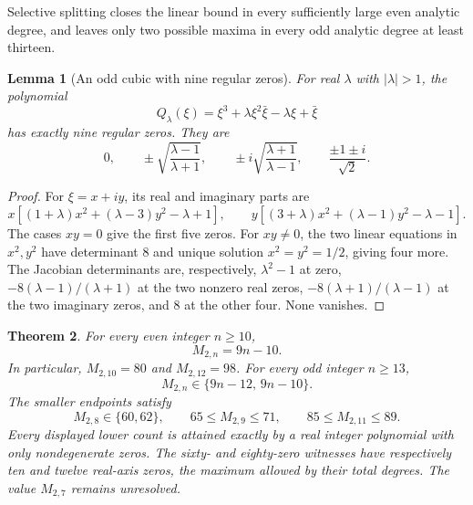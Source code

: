 \documentclass[UTF8,11pt]{ctexart}
\newtheorem{thm}{Theorem}[section]
\newtheorem{lem}[thm]{Lemma}
\theoremstyle{definition}
\numberwithin{equation}{section}
\begin{document}
Selective splitting closes the linear bound in every sufficiently
large even analytic degree, and leaves only two possible
maxima in every odd analytic degree at least thirteen.

\begin{lem}[An odd cubic with nine regular zeros]
\label{v41:lem:oddnine}
For real $\lambda$ with $|\lambda|>1$, the polynomial
\[
                       Q_\lambda(\xi)=\xi^3+
                    \lambda\xi^2\bar\xi-\lambda\xi+\bar\xi
\]
has exactly nine regular zeros. They are
\[
 0,\qquad\pm\sqrt{\frac{\lambda-1}{\lambda+1}},\qquad
 \pm i\sqrt{\frac{\lambda+1}{\lambda-1}},\qquad
 \frac{\pm1\pm i}{\sqrt2}.
\]
\end{lem}
\begin{proof}
For $\xi=x+iy$, its real and imaginary parts are
\[
 x[(1+\lambda)x^2+(\lambda-3)y^2-\lambda+1],\qquad
 y[(3+\lambda)x^2+(\lambda-1)y^2-\lambda-1].
\]
The cases $xy=0$ give the first five zeros. For $xy\ne0$,
the two linear equations in $x^2,y^2$ have determinant
$8$ and unique solution $x^2=y^2=1/2$, giving four more.
The Jacobian determinants are, respectively,
$\lambda^2-1$ at zero,
$-8(\lambda-1)/(\lambda+1)$ at the two nonzero real zeros,
$-8(\lambda+1)/(\lambda-1)$ at the two imaginary zeros,
and $8$ at the other four. None vanishes.
\end{proof}

\begin{thm}\label{v40:thm:rectangle}
For every even integer $n\ge10$,
\begin{equation}\label{v40:eq:rectangle}
                              M_{2,n}=9n-10.
\end{equation}
In particular, $M_{2,10}=80$ and $M_{2,12}=98$.
For every odd integer $n\ge13$,
\begin{equation}\label{v40:eq:oddrectangle}
                         M_{2,n}\in\{9n-12,\,9n-10\}.
\end{equation}
The smaller endpoints satisfy
\begin{equation}\label{v40:eq:rectangle8}
             M_{2,8}\in\{60,62\},\qquad
                         65\le M_{2,9}\le71,\qquad
                         85\le M_{2,11}\le89.
\end{equation}
Every displayed lower count is attained exactly by a real
integer polynomial with only nondegenerate zeros. The sixty-
and eighty-zero witnesses have respectively ten and twelve
real-axis zeros, the maximum allowed by their total degrees.
The value $M_{2,7}$ remains unresolved.
\end{thm}
\end{document}
